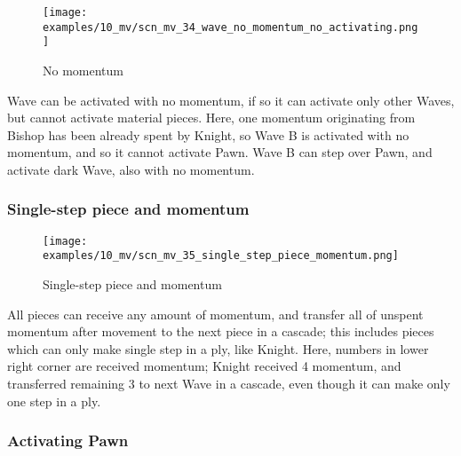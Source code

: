 \vspace*{-1.4\baselineskip}
\noindent
\begin{figure}[h]
\texttt{[image: examples/10\_mv/scn\_mv\_34\_wave\_no\_momentum\_no\_activating.png]}
\caption{No momentum}
\label{fig:scn_mv_34_wave_no_momentum_no_activating}
\end{figure}

Wave can be activated with no momentum, if so it can activate only other Waves, but
cannot activate material pieces. Here, one momentum originating from Bishop has been
already spent by Knight, so Wave B is activated with no momentum, and so it cannot
activate Pawn. Wave B can step over Pawn, and activate dark Wave, also with no momentum.

\clearpage %

\subsubsection*{Single-step piece and momentum}
\label{sec:Miranda's veil/Wave/Cascading Waves/Single-step piece and momentum}

\vspace*{-1.5\baselineskip}
\noindent
\begin{figure}[h]
\texttt{[image: examples/10\_mv/scn\_mv\_35\_single\_step\_piece\_momentum.png]}
\vspace*{-1.4\baselineskip}
\caption{Single-step piece and momentum}
\label{fig:scn_mv_35_single_step_piece_momentum}
\end{figure}

\vspace*{-0.5\baselineskip}
All pieces can receive any amount of momentum, and transfer all of unspent momentum
after movement to the next piece in a cascade; this includes pieces which can only
make single step in a ply, like Knight.\newline
\indent
Here, numbers in lower right corner are received momentum; Knight received 4 momentum,
and transferred remaining 3 to next Wave in a cascade, even though it can make only one
step in a ply.

\clearpage %

\subsubsection*{Activating Pawn}
\label{sec:Miranda's veil/Wave/Cascading Waves/Activating Pawn}

